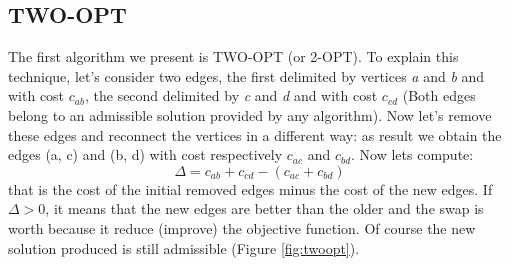 \subsection{TWO-OPT}
\label{two-opt}
The first algorithm we present is TWO-OPT (or 2-OPT). To explain this technique, let's consider two edges, the first delimited by vertices \textit{a} and \textit{b} and with cost $c_{ab}$, the second delimited by \textit{c} and \textit{d} and with cost $c_{cd}$ (Both edges belong to an admissible solution provided by any algorithm). Now let's remove these edges and reconnect the vertices in a different way: as result we obtain the edges (a, c) and (b, d) with cost respectively $c_{ac}$ and $c_{bd}$. Now lets compute: 
\begin{equation*}
\Delta = c_{ab} + c_{cd} - (c_{ac} + c_{bd})
\end{equation*}
that is the cost of the initial removed edges minus the cost of the new edges. If $\Delta > 0$, it means that the new edges are better than the older and the swap is worth because it reduce (improve) the objective function. Of course the new solution produced is still admissible (Figure \ref{fig:twoopt}).\\

